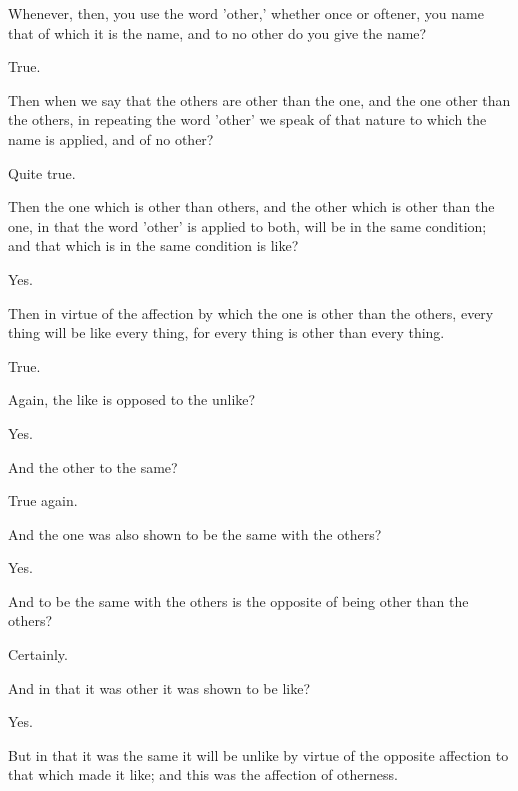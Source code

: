 \documentclass[11pt,letter]{article}
\begin{document}
\par  Whenever, then, you use the word 'other,' whether once or oftener, you name that of which it is the name, and to no other do you give the name?

\par  True.

\par  Then when we say that the others are other than the one, and the one other than the others, in repeating the word 'other' we speak of that nature to which the name is applied, and of no other?

\par  Quite true.

\par  Then the one which is other than others, and the other which is other than the one, in that the word 'other' is applied to both, will be in the same condition; and that which is in the same condition is like?

\par  Yes.

\par  Then in virtue of the affection by which the one is other than the others, every thing will be like every thing, for every thing is other than every thing.

\par  True.

\par  Again, the like is opposed to the unlike?

\par  Yes.

\par  And the other to the same?

\par  True again.

\par  And the one was also shown to be the same with the others?

\par  Yes.

\par  And to be the same with the others is the opposite of being other than the others?

\par  Certainly.

\par  And in that it was other it was shown to be like?

\par  Yes.

\par  But in that it was the same it will be unlike by virtue of the opposite affection to that which made it like; and this was the affection of otherness.
\end{document}
